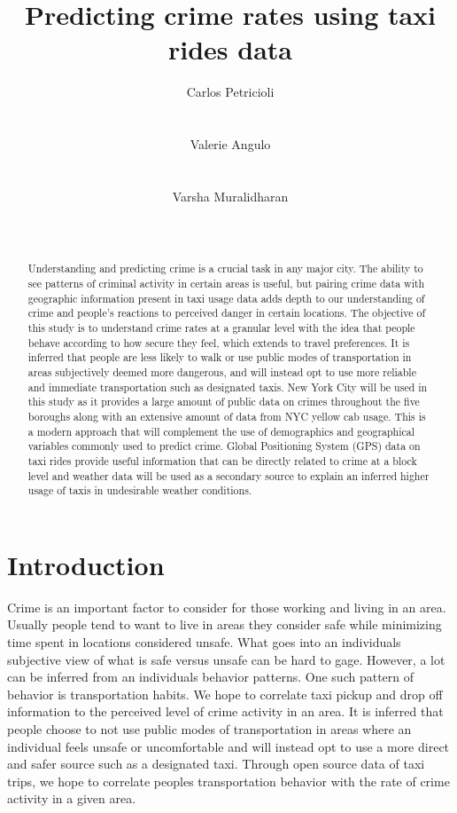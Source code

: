 \documentclass{sigkddExp}
\title{Predicting crime rates using taxi rides data}
\author{
\alignauthor Carlos Petricioli \\
       \affaddr{New York University}\\
       \affaddr{New York, USA}\\
       \email{petricioli@nyu.edu}
\alignauthor Valerie Angulo\\
       \affaddr{New York University}\\
       \affaddr{New York, USA}\\
       \email{vaa238@nyu.edu}
\alignauthor Varsha Muralidharan \\
       \affaddr{New York University}\\
       \affaddr{New York, USA}\\
       \email{vm1370@nyu.edu}
}
\begin{document}
\maketitle

\begin{abstract}

Understanding and predicting crime is a crucial task in any major city. The ability to see patterns of criminal activity in certain areas is useful, but pairing crime data with geographic information present in taxi usage data adds depth to our understanding of crime and people's reactions to perceived danger in certain locations. The objective of this study is to understand crime rates at a granular level with the idea that people behave according to how secure they feel, which extends to travel preferences. It is inferred that people are less likely to walk or use public modes of transportation in areas subjectively deemed more dangerous, and will instead opt to use more reliable and immediate transportation such as designated taxis. New York City will be used in this study as it provides a large amount of public data on crimes throughout the five boroughs along with an extensive amount of data from NYC yellow cab usage. This is a modern approach that will complement the use of demographics and geographical variables commonly used to predict crime. Global Positioning System (GPS) data on taxi rides provide useful information that can be directly related to crime at a block level and weather data will be used as a secondary source to explain an inferred higher usage of taxis in undesirable weather conditions. 

\end{abstract}




\section{Introduction}

Crime is an important factor to consider for those working and living in an area. Usually people tend to want to live in areas they consider safe while minimizing time spent in locations considered unsafe. %
What goes into an individuals subjective view of what is safe versus unsafe can be hard to gage. However, a lot can be inferred from an individuals behavior patterns. One such pattern of behavior is transportation habits. We hope to correlate taxi pickup and drop off information to the perceived level of crime activity in an area. It is inferred that people choose to not use public modes of transportation in areas where an individual feels unsafe or uncomfortable and will instead opt to use a more direct and safer source such as a designated taxi. Through open source data of taxi trips, we hope to correlate peoples transportation behavior with the rate of crime activity in a given area. 
\end{document}
